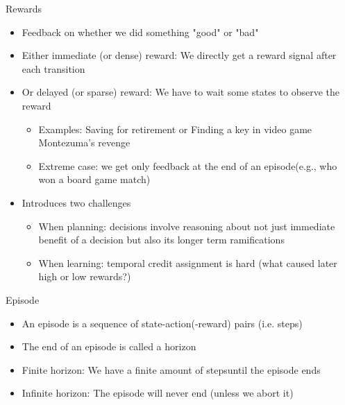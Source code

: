 \documentclass[aspectratio=169]{../latex_main/tntbeamer}  %
\begin{document}
\begin{frame}[c]{Rewards}
	\begin{itemize}
		\item Feedback on whether we did something "good" or "bad"
		\smallskip
		\pause
		\item Either immediate (or dense) reward: We directly get a reward signal after each transition
		\item Or delayed (or sparse) reward: We have to wait some states to observe the reward
		\begin{itemize}
			\item Examples: Saving for retirement or Finding a key in video game Montezuma’s revenge
			\item Extreme case: we get only feedback at the end of an episode\newline (e.g., who won a board game match)
		\end{itemize}
        \pause
		\item Introduces two challenges
		\begin{itemize}
			\item When planning: decisions involve reasoning about not just immediate
			benefit of a decision but also its longer term ramifications
			\item When learning: temporal credit assignment is hard (what caused later
			high or low rewards?)
		\end{itemize}
	\end{itemize}
\end{frame}
\begin{frame}[c]{Episode}
	\begin{itemize}
		\item An episode is a sequence of state-action(-reward) pairs (i.e. steps)
		\item The end of an episode is called a horizon
		\smallskip
		\pause
		\item Finite horizon: We have a finite amount of steps\newline until the episode ends
		\item Infinite horizon: The episode will never end (unless we abort it)
	\end{itemize}
\end{frame}
\end{document}
